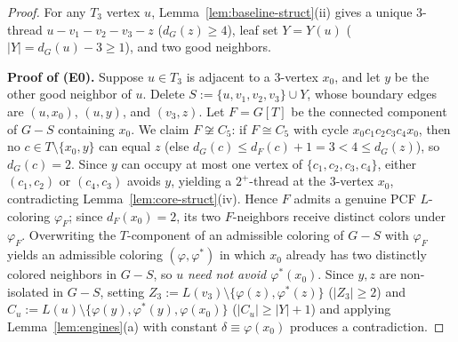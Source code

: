 \documentclass[11pt,a4paper]{article}
\theoremstyle{definition}
\begin{document}
\begin{proof}
For any $T_3$ vertex $u$, Lemma~\ref{lem:baseline-struct}(ii) gives a unique $3$-thread $u - v_1 - v_2 - v_3 - z$ ($d_G(z) \ge 4$), leaf set $Y = Y(u)$ ($|Y| = d_G(u) - 3 \ge 1$), and two good neighbors.

\medskip
\noindent\textbf{Proof of (E0).} Suppose $u \in T_3$ is adjacent to a $3$-vertex $x_0$, and let $y$ be the other good neighbor of $u$. Delete $S := \{u, v_1, v_2, v_3\} \cup Y$, whose boundary edges are $(u, x_0)$, $(u, y)$, and $(v_3, z)$. Let $F = G[T]$ be the connected component of $G - S$ containing $x_0$. We claim $F \not\cong C_5$: if $F \cong C_5$ with cycle $x_0 c_1 c_2 c_3 c_4 x_0$, then no $c \in T \setminus \{x_0, y\}$ can equal $z$ (else $d_G(c) \le d_F(c) + 1 = 3 < 4 \le d_G(z)$), so $d_G(c) = 2$. Since $y$ can occupy at most one vertex of $\{c_1, c_2, c_3, c_4\}$, either $(c_1, c_2)$ or $(c_4, c_3)$ avoids $y$, yielding a $2^+$-thread at the $3$-vertex $x_0$, contradicting Lemma~\ref{lem:core-struct}(iv). Hence $F$ admits a genuine PCF $L$-coloring $\varphi_F$; since $d_F(x_0) = 2$, its two $F$-neighbors receive distinct colors under $\varphi_F$. Overwriting the $T$-component of an admissible coloring of $G - S$ with $\varphi_F$ yields an admissible coloring $(\varphi, \varphi^*)$ in which $x_0$ already has two distinctly colored neighbors in $G - S$, so $u$ \emph{need not avoid $\varphi^*(x_0)$}. Since $y, z$ are non-isolated in $G - S$, setting $Z_3 := L(v_3) \setminus \{\varphi(z), \varphi^*(z)\}$ ($|Z_3| \ge 2$) and $C_u := L(u) \setminus \{\varphi(y), \varphi^*(y), \varphi(x_0)\}$ ($|C_u| \ge |Y| + 1$) and applying Lemma~\ref{lem:engines}(a) with constant $\delta \equiv \varphi(x_0)$ produces a contradiction.


\end{proof}
\end{document}
